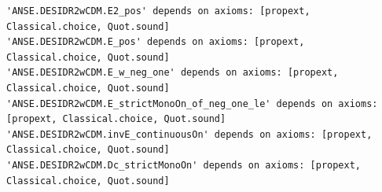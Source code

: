 \begin{lstlisting}[language={}]
'ANSE.DESIDR2wCDM.E2_pos' depends on axioms: [propext, Classical.choice, Quot.sound]
'ANSE.DESIDR2wCDM.E_pos' depends on axioms: [propext, Classical.choice, Quot.sound]
'ANSE.DESIDR2wCDM.E_w_neg_one' depends on axioms: [propext, Classical.choice, Quot.sound]
'ANSE.DESIDR2wCDM.E_strictMonoOn_of_neg_one_le' depends on axioms: [propext, Classical.choice, Quot.sound]
'ANSE.DESIDR2wCDM.invE_continuousOn' depends on axioms: [propext, Classical.choice, Quot.sound]
'ANSE.DESIDR2wCDM.Dc_strictMonoOn' depends on axioms: [propext, Classical.choice, Quot.sound]
\end{lstlisting}
